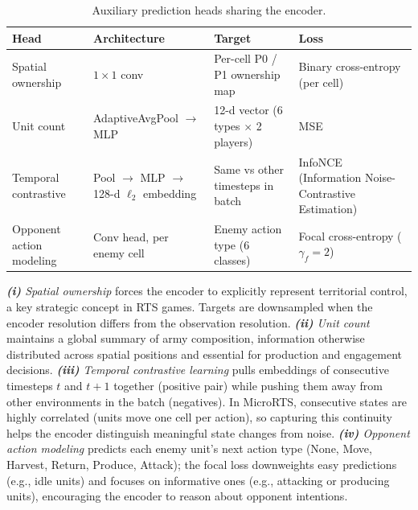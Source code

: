 \begin{table}[!htb]
\centering
\caption[Auxiliary prediction heads]{Auxiliary prediction heads sharing the  encoder.}
\label{tab:aux-tasks}
\footnotesize
\begin{tabularx}{\textwidth}{@{}l X X X@{}}
\toprule
\textbf{Head} & \textbf{Architecture} & \textbf{Target} & \textbf{Loss} \\
\midrule
Spatial ownership        & $1{\times}1$ conv                                & Per-cell P0 / P1 ownership map           & Binary cross-entropy (per cell) \\
Unit count               & AdaptiveAvgPool $\to$ MLP                         & 12-d vector (6 types $\times$ 2 players) & MSE \\
Temporal contrastive     & Pool $\to$ MLP $\to$ 128-d $\ell_2$ embedding     & Same vs other timesteps in batch         & InfoNCE (Information Noise-Contrastive Estimation)~\cite{oordRepresentationLearningContrastive2018} \\
Opponent action modeling & Conv head, per enemy cell                         & Enemy action type (6 classes)            & Focal cross-entropy ($\gamma_f=2$)~\cite{linFocalLossDense2017} \\
\bottomrule
\end{tabularx}
\end{table}

\emph{\textbf{(i)} Spatial ownership} forces the encoder to explicitly represent territorial control, a key strategic concept in RTS games. Targets are downsampled when the encoder resolution differs from the observation resolution. \emph{\textbf{(ii)} Unit count} maintains a global summary of army composition, information otherwise distributed across spatial positions and essential for production and engagement decisions. \emph{\textbf{(iii)} Temporal contrastive learning} pulls embeddings of consecutive timesteps $t$ and $t{+}1$ together (positive pair) while pushing them away from other environments in the batch (negatives). In MicroRTS, consecutive states are highly correlated (units move one cell per action), so capturing this continuity helps the encoder distinguish meaningful state changes from noise. \emph{\textbf{(iv)} Opponent action modeling} predicts each enemy unit's next action type (None, Move, Harvest, Return, Produce, Attack); the focal loss downweights easy predictions (e.g., idle units) and focuses on informative ones (e.g., attacking or producing units), encouraging the encoder to reason about opponent intentions.

